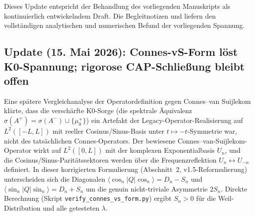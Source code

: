 \documentclass[11pt,a4paper]{article}
\theoremstyle{remark}
\theoremstyle{plain}
\begin{document}
Dieses Update entspricht der Behandlung des vorliegenden Manuskripts als kontinuierlich entwickelndem Draft. Die Begleitnotizen  und  liefern den vollständigen analytischen und numerischen Befund der vorliegenden Spannung.

\subsection{Update (15. Mai 2026): Connes-vS-Form löst K0-Spannung; rigorose CAP-Schließung bleibt offen}
\label{sec:k0-cvs-resolution}

Eine spätere Vergleichanalyse der Operatordefinition gegen Connes--van Suijlekom \cite{ConnesvS2025} klärte, dass die verschärfte K0-Sorge (die spektrale Äquivalenz $\sigma(A^+) = \sigma(A^-) \cup \{\mu^+_0\}$) ein Artefakt der Legacy-Operator-Realisierung auf $L^2([-L,L])$ mit reeller Cosinus/Sinus-Basis unter $t\mapsto -t$-Symmetrie war, nicht des tatsächlichen Connes-Operators. Der bewiesene Connes--van-Suijlekom-Operator wirkt auf $L^2([0,L])$ mit der komplexen Exponentialbasis $U_n$, und die Cosinus/Sinus-Paritätssektoren werden über die Frequenzreflektion $U_n\leftrightarrow U_{-n}$ definiert. In dieser korrigierten Formulierung (Abschnitt~2, v1.5-Reformulierung) unterscheiden sich die Diagonalen $\langle\cos_n|Q|\cos_n\rangle = D_n - S_n$ und $\langle\sin_n|Q|\sin_n\rangle = D_n + S_n$ um die genuin nicht-triviale Asymmetrie $2S_n$. Direkte Berechnung (Skript \texttt{verify\_connes\_vs\_form.py}) ergibt $S_n > 0$ für die Weil-Distribution und alle getesteten $\lambda$.
\end{document}
